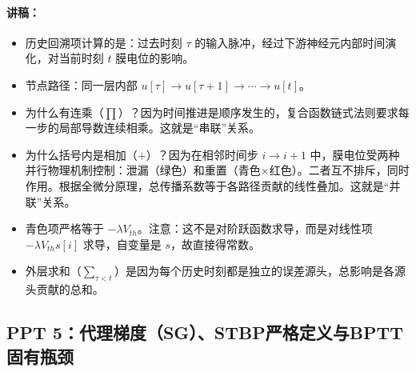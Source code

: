 \documentclass[journal,12pt,onecolumn]{IEEEtran}
\begin{document}
\paragraph{\textbf{讲稿：}}
\begin{itemize}
    \item 历史回溯项计算的是：过去时刻 \(\tau\) 的输入脉冲，经过下游神经元内部时间演化，对当前时刻 \(t\) 膜电位的影响。
    \item 节点路径：同一层内部 \(u[\tau] \to u[\tau+1] \to \cdots \to u[t]\)。
    \item 为什么有连乘（\(\prod\)）？因为时间推进是顺序发生的，复合函数链式法则要求每一步的局部导数连续相乘。这就是“串联”关系。
    \item 为什么括号内是相加（\(+\)）？因为在相邻时间步 \(i \to i+1\) 中，膜电位受两种并行物理机制控制：泄漏（绿色）和重置（青色×红色）。二者互不排斥，同时作用。根据全微分原理，总传播系数等于各路径贡献的线性叠加。这就是“并联”关系。
    \item 青色项严格等于 \(-\lambda V_{th}\)。注意：这不是对阶跃函数求导，而是对线性项 \(-\lambda V_{th} s[i]\) 求导，自变量是 \(s\)，故直接得常数。
    \item 外层求和（\(\sum_{\tau < t}\)）是因为每个历史时刻都是独立的误差源头，总影响是各源头贡献的总和。
\end{itemize}

\subsection*{PPT 5：代理梯度（SG）、STBP严格定义与BPTT固有瓶颈}
\end{document}
